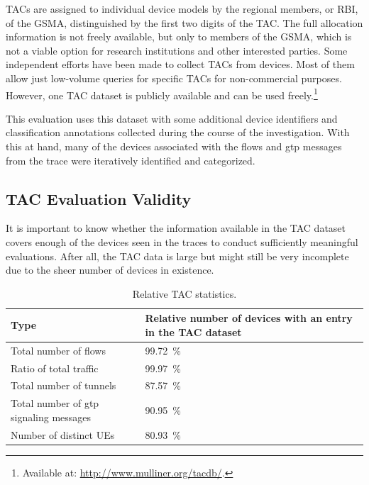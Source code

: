 \glspl{TAC} are assigned to individual device models by the regional members, or \gls{RBI}, of the \gls{GSMA}, distinguished by the first two digits of the \gls{TAC}. The full allocation information is not freely available, but only to members of the \gls{GSMA}, which is not a viable option for research institutions and other interested parties. Some independent efforts have been made to collect \glspl{TAC} from devices. Most of them allow just low-volume queries for specific \glspl{TAC} for non-commercial purposes. However, one \gls{TAC} dataset is publicly available and can be used freely.\footnote{Available at: \url{http://www.mulliner.org/tacdb/}.}

This evaluation uses this dataset with some additional device identifiers and classification annotations collected during the course of the investigation. With this at hand, many of the devices associated with the flows and \gls{gtp} messages from the trace were iteratively identified and categorized.


\subsection{\texorpdfstring{\acrshort{TAC}}{TAC} Evaluation Validity}

It is important to know whether the information available in the \gls{TAC} dataset covers enough of the devices seen in the traces to conduct sufficiently meaningful evaluations. After all, the \gls{TAC} data is large but might still be very incomplete due to the sheer number of devices in existence.

\begin{table}
\centering
\caption{Relative \acrshort{TAC} statistics.}
\label{c4:tbl:tacstats}
	\begin{tabu}{XX[r]}
		\toprule
		\textbf{Type} & \textbf{Relative number of devices with an entry in the \gls{TAC} dataset}\\ 
		\midrule
		Total number of flows & \SI{99.72}{\percent} \\
		Ratio of total traffic & \SI{99.97}{\percent} \\
		Total number of tunnels & \SI{87.57}{\percent} \\
		Total number of \gls{gtp} signaling messages & \SI{90.95}{\percent} \\
		Number of distinct \glspl{UE} & \SI{80.93}{\percent} \\ 
		\bottomrule
	\end{tabu}
\end{table}

